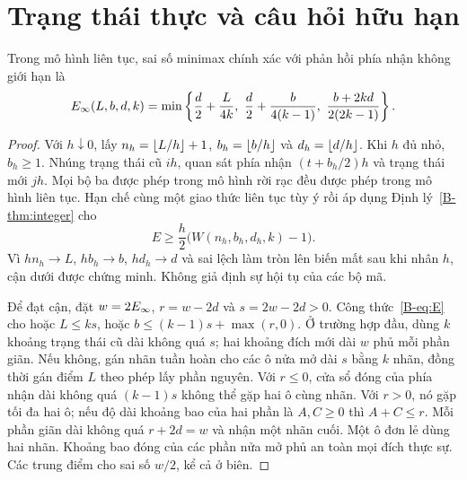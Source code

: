 \section{Trạng thái thực và câu hỏi hữu hạn}
\begin{theorem}\label{B-thm:continuous}
Trong mô hình liên tục, sai số minimax chính xác với phản hồi phía nhận không giới hạn là
\begin{equation}\label{B-eq:E}
E_{\infty}(L,b,d,k)=\min\left\{\frac d2+\frac{L}{4k},\ \frac d2+\frac{b}{4(k-1)},\ \frac{b+2kd}{2(2k-1)}\right\}.
\end{equation}
\end{theorem}
\begin{proof}
Với $h\downarrow0$, lấy $n_h=\left\lfloor L/h\right\rfloor+1$, $b_h=\left\lfloor b/h\right\rfloor$ và $d_h=\left\lfloor d/h\right\rfloor$. Khi $h$ đủ nhỏ, $b_h\geq1$. Nhúng trạng thái cũ $ih$, quan sát phía nhận $(t+b_h/2)h$ và trạng thái mới $jh$. Mọi bộ ba được phép trong mô hình rời rạc đều được phép trong mô hình liên tục. Hạn chế cùng một giao thức liên tục tùy ý rồi áp dụng Định lý~\ref{B-thm:integer} cho
\begin{equation}\label{B-eq:grid}
E\geq\frac h2\bigl(W(n_h,b_h,d_h,k)-1\bigr).
\end{equation}
Vì $hn_h\to L$, $hb_h\to b$, $hd_h\to d$ và sai lệch làm tròn lên biến mất sau khi nhân $h$, cận dưới được chứng minh. Không giả định sự hội tụ của các bộ mã.

Để đạt cận, đặt $w=2E_{\infty}$, $r=w-2d$ và $s=2w-2d>0$. Công thức~\eqref{B-eq:E} cho hoặc $L\leq ks$, hoặc $b\leq(k-1)s+\max(r,0)$. Ở trường hợp đầu, dùng $k$ khoảng trạng thái cũ dài không quá $s$; hai khoảng đích mới dài $w$ phủ mỗi phần giãn. Nếu không, gán nhãn tuần hoàn cho các ô nửa mở dài $s$ bằng $k$ nhãn, đồng thời gán điểm $L$ theo phép lấy phần nguyên. Với $r\leq0$, cửa sổ đóng của phía nhận dài không quá $(k-1)s$ không thể gặp hai ô cùng nhãn. Với $r>0$, nó gặp tối đa hai ô; nếu độ dài khoảng bao của hai phần là $A,C\geq0$ thì $A+C\leq r$. Mỗi phần giãn dài không quá $r+2d=w$ và nhận một nhãn cuối. Một ô đơn lẻ dùng hai nhãn. Khoảng bao đóng của các phần nửa mở phủ an toàn mọi đích thực sự. Các trung điểm cho sai số $w/2$, kể cả ở biên.
\end{proof}


